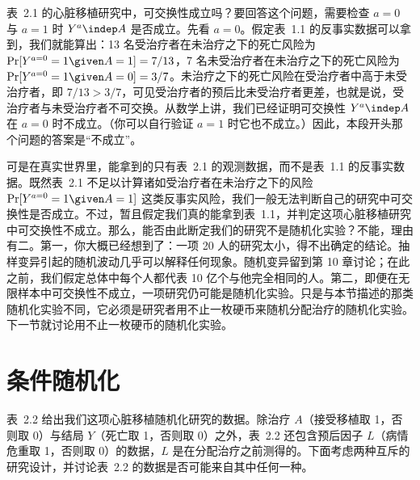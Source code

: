 表~2.1 的心脏移植研究中，可交换性成立吗？要回答这个问题，需要检查 $a=0$ 与 $a=1$ 时 $Y^{a}\indep A$ 是否成立。先看 $a=0$。假定表~1.1 的反事实数据可以拿到，我们就能算出：13 名受治疗者在未治疗之下的死亡风险为 $\Pr[Y^{a=0}=1\given A=1]=7/13$，7 名未受治疗者在未治疗之下的死亡风险为 $\Pr[Y^{a=0}=1\given A=0]=3/7$。未治疗之下的死亡风险在受治疗者中高于未受治疗者，即 $7/13>3/7$，可见受治疗者的预后比未受治疗者更差，也就是说，受治疗者与未受治疗者不可交换。从数学上讲，我们已经证明可交换性 $Y^{a}\indep A$ 在 $a=0$ 时不成立。（你可以自行验证 $a=1$ 时它也不成立。）因此，本段开头那个问题的答案是“不成立”。

可是在真实世界里，能拿到的只有表~2.1 的观测数据，而不是表~1.1 的反事实数据。既然表~2.1 不足以计算诸如受治疗者在未治疗之下的风险 $\Pr[Y^{a=0}=1\given A=1]$ 这类反事实风险，我们一般无法判断自己的研究中可交换性是否成立。不过，暂且假定我们真的能拿到表~1.1，并判定这项心脏移植研究中可交换性不成立。那么，能否由此断定我们的研究不是随机化实验？不能，理由有二。第一，你大概已经想到了：一项 20 人的研究太小，得不出确定的结论。抽样变异引起的随机波动几乎可以解释任何现象。随机变异留到第 10 章讨论；在此之前，我们假定总体中每个人都代表 10 亿个与他完全相同的人。第二，即便在无限样本中可交换性不成立，一项研究仍可能是随机化实验。只是与本节描述的那类随机化实验不同，它必须是研究者用不止一枚硬币来随机分配治疗的随机化实验。下一节就讨论用不止一枚硬币的随机化实验。


\section{条件随机化}

表~2.2 给出我们这项心脏移植随机化研究的数据。除治疗 $A$（接受移植取 1，否则取 0）与结局 $Y$（死亡取 1，否则取 0）之外，表~2.2 还包含预后因子 $L$（病情危重取 1，否则取 0）的数据，$L$ 是在分配治疗之前测得的。下面考虑两种互斥的研究设计，并讨论表~2.2 的数据是否可能来自其中任何一种。

